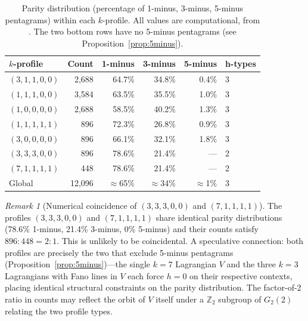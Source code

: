 \documentclass[11pt,a4paper]{article}
\theoremstyle{remark}
\newtheorem{remark}[theorem]{Remark}
\begin{document}
\begin{table}[H]
\centering
\caption{Parity distribution (percentage of 1-minus, 3-minus, 5-minus
pentagrams) within each $k$-profile.
All values are computational, from \cite{PaperXIVsuppl}.
The two bottom rows have no 5-minus pentagrams (see
Proposition~\ref{prop:5minus}).}
\label{tab:hpatterns}
\begin{tabular}{lrrrrl}
\toprule
$k$-profile & Count & 1-minus & 3-minus & 5-minus & h-types \\
\midrule
$(3,1,1,0,0)$ & 2{,}688 & 64.7\% & 34.8\% & 0.4\% & 3 \\
$(1,1,1,0,0)$ & 3{,}584 & 63.5\% & 35.5\% & 1.0\% & 3 \\
$(1,0,0,0,0)$ & 2{,}688 & 58.5\% & 40.2\% & 1.3\% & 3 \\
$(1,1,1,1,1)$ &    896 & 72.3\% & 26.8\% & 0.9\% & 3 \\
$(3,0,0,0,0)$ &    896 & 66.1\% & 32.1\% & 1.8\% & 3 \\
$(3,3,3,0,0)$ &    896 & 78.6\% & 21.4\% & ---  & 2 \\
$(7,1,1,1,1)$ &    448 & 78.6\% & 21.4\% & ---  & 2 \\
\midrule
Global        & 12{,}096 & $\approx$65\% & $\approx$34\% & $\approx$1\% & 3 \\
\bottomrule
\end{tabular}
\end{table}

\begin{remark}[Numerical coincidence of $(3,3,3,0,0)$ and $(7,1,1,1,1)$]
\label{rem:coincidence}
The profiles $(3,3,3,0,0)$ and $(7,1,1,1,1)$ share identical parity
distributions (78.6\% 1-minus, 21.4\% 3-minus, 0\% 5-minus) and their
counts satisfy $896 : 448 = 2 : 1$.
This is unlikely to be coincidental.
A speculative connection: both profiles are precisely the two that exclude
5-minus pentagrams (Proposition~\ref{prop:5minus})---the single $k=7$
Lagrangian $V$ and the three $k=3$ Lagrangians with Fano lines in $V$ each
force $h = 0$ on their respective contexts, placing identical structural
constraints on the parity distribution.
The factor-of-2 ratio in counts may reflect the orbit of $V$ itself under a
$\mathbb{Z}_2$ subgroup of $G_2(2)$ relating the two profile types.
\end{remark}
\end{document}
